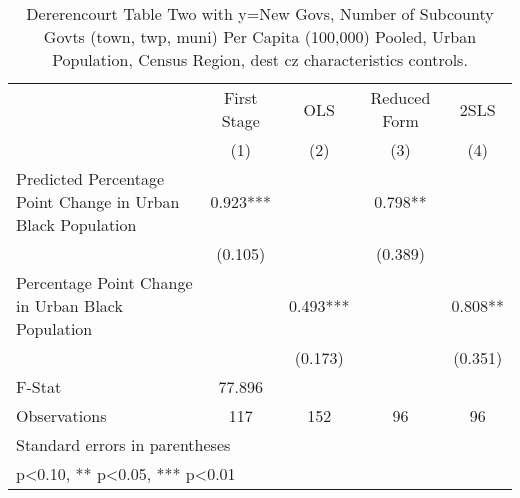 \begin{table}[htbp]\centering
\def\sym#1{\ifmmode^{#1}\else\(^{#1}\)\fi}
\caption{Dererencourt Table Two with y=New Govs, Number of Subcounty Govts (town, twp, muni) Per Capita (100,000) Pooled, Urban Population, Census Region, dest cz characteristics controls.}
\begin{tabular}{l*{4}{c}}
\toprule
                    & First Stage   &         OLS   &Reduced Form   &        2SLS   \\
                    &\multicolumn{1}{c}{(1)}   &\multicolumn{1}{c}{(2)}   &\multicolumn{1}{c}{(3)}   &\multicolumn{1}{c}{(4)}   \\
\midrule
Predicted Percentage Point Change in Urban Black Population&       0.923***&               &       0.798** &               \\
                    &     (0.105)   &               &     (0.389)   &               \\
\addlinespace
Percentage Point Change in Urban Black Population&               &       0.493***&               &       0.808** \\
                    &               &     (0.173)   &               &     (0.351)   \\
\midrule
F-Stat              &      77.896   &               &               &               \\
Observations        &         117   &         152   &          96   &          96   \\
\bottomrule
\multicolumn{5}{l}{\footnotesize Standard errors in parentheses}\\
\multicolumn{5}{l}{\footnotesize * p<0.10, ** p<0.05, *** p<0.01}\\
\end{tabular}
\end{table}
